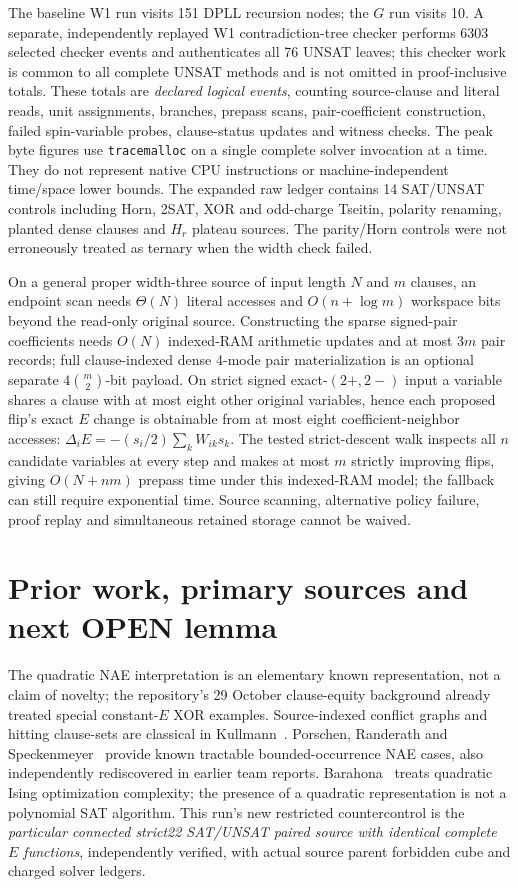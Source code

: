 \documentclass[10pt]{article}
\begin{document}
The baseline W1 run visits 151 DPLL recursion nodes; the $G$ run visits 10. A separate, independently replayed W1 contradiction-tree checker performs 6303 selected checker events and authenticates all 76 UNSAT leaves; this checker work is common to all complete UNSAT methods and is not omitted in proof-inclusive totals. These totals are \emph{declared logical events}, counting source-clause and literal reads, unit assignments, branches, prepass scans, pair-coefficient construction, failed spin-variable probes, clause-status updates and witness checks. The peak byte figures use \texttt{tracemalloc} on a single complete solver invocation at a time. They do not represent native CPU instructions or machine-independent time/space lower bounds. The expanded raw ledger contains 14 SAT/UNSAT controls including Horn, 2SAT, XOR and odd-charge Tseitin, polarity renaming, planted dense clauses and $H_r$ plateau sources. The parity/Horn controls were not erroneously treated as ternary when the width check failed.

On a general proper width-three source of input length $N$ and $m$ clauses, an endpoint scan needs $\Theta(N)$ literal accesses and $O(n+\log m)$ workspace bits beyond the read-only original source. Constructing the sparse signed-pair coefficients needs $O(N)$ indexed-RAM arithmetic updates and at most $3m$ pair records; full clause-indexed dense 4-mode pair materialization is an optional separate $4\binom m2$-bit payload. On strict signed exact-$(2+,2-)$ input a variable shares a clause with at most eight other original variables, hence each proposed flip's exact $E$ change is obtainable from at most eight coefficient-neighbor accesses: $\Delta_i E=-(s_i/2)\sum_k W_{ik}s_k$. The tested strict-descent walk inspects all $n$ candidate variables at every step and makes at most $m$ strictly improving flips, giving $O(N+nm)$ prepass time under this indexed-RAM model; the fallback can still require exponential time. Source scanning, alternative policy failure, proof replay and simultaneous retained storage cannot be waived.
\section{Prior work, primary sources and next OPEN lemma}
The quadratic NAE interpretation is an elementary known representation, not a claim of novelty; the repository's 29 October clause-equity background already treated special constant-$E$ XOR examples. Source-indexed conflict graphs and hitting clause-sets are classical in Kullmann~\cite{kullmann}. Porschen, Randerath and Speckenmeyer~\cite{porschen} provide known tractable bounded-occurrence NAE cases, also independently rediscovered in earlier team reports. Barahona~\cite{barahona} treats quadratic Ising optimization complexity; the presence of a quadratic representation is not a polynomial SAT algorithm. This run's new restricted countercontrol is the \emph{particular connected strict22 SAT/UNSAT paired source with identical complete $E$ functions}, independently verified, with actual source parent forbidden cube and charged solver ledgers.
\end{document}
